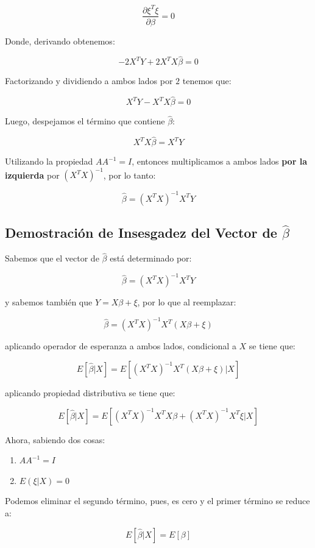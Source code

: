 \documentclass[
]{book}
\providecommand{\tightlist}{%
  \setlength{\itemsep}{0pt}\setlength{\parskip}{0pt}}
\begin{document}
\[
\frac{\partial \xi^T\xi}{\partial \beta} = 0
\]

Donde, derivando obtenemos:

\[
-2X^TY + 2X^TX\hat{\beta} = 0
\]

Factorizando y dividiendo a ambos lados por \(2\) tenemos que:

\[
X^TY - X^TX\hat{\beta} = 0
\]

Luego, despejamos el término que contiene \(\hat{\beta}\):

\[
X^TX\hat{\beta} = X^TY
\]

Utilizando la propiedad \(AA^{-1} = I\), entonces multiplicamos a ambos lados \textbf{por la izquierda} por \((X^TX)^{-1}\), por lo tanto:

\[
\hat{\beta} = (X^TX)^{-1}X^TY
\]

\subsection{\texorpdfstring{Demostración de Insesgadez del Vector de \(\hat{\beta}\)}{Demostración de Insesgadez del Vector de \textbackslash hat\{\textbackslash beta\}}}\label{demostraciuxf3n-de-insesgadez-del-vector-de-hatbeta}

Sabemos que el vector de \(\hat{\beta}\) está determinado por:

\[
\hat{\beta} = (X^TX)^{-1}X^TY
\]

y sabemos también que \(Y = X\beta + \xi\), por lo que al reemplazar:

\[
\hat{\beta} = (X^TX)^{-1}X^T(X\beta + \xi)
\]

aplicando operador de esperanza a ambos lados, condicional a \(X\) se tiene que:

\[
E[\hat{\beta}|X] = E[(X^TX)^{-1}X^T(X\beta + \xi)|X]
\]

aplicando propiedad distributiva se tiene que:

\[
E[\hat{\beta}|X] = E[(X^TX)^{-1}X^TX\beta + (X^TX)^{-1}X^T\xi|X]
\]

Ahora, sabiendo dos cosas:

\begin{enumerate}
\def\labelenumi{\arabic{enumi}.}
\tightlist
\item
  \(AA^{-1} = I\)
\item
  \(E(\xi|X) = 0\)
\end{enumerate}

Podemos eliminar el segundo término, pues, es cero y el primer término se reduce a:

\[
E[\hat{\beta}|X] = E[\beta]
\]
\end{document}
